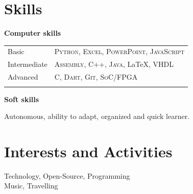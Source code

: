 \documentclass[a4paper,10pt]{article}
\begin{document}
\section{Skills}

\textbf{Computer skills} \\
\begin{tabular}{p{2.3cm}l}
    Basic & \textsc{Python}, \textsc{Excel}, \textsc{PowerPoint}, \textsc{JavaScript} \\
    Intermediate & \textsc{Assembly}, \textsc{C++}, \textsc{Java}, \LaTeX, \textsc{VHDL} \\
    Advanced & \textsc{C}, \textsc{Dart}, \textsc{Git}, \textsc{SoC/FPGA} \\
    \\
\end{tabular}

\parbox{2.8cm}{\textbf{Soft skills}} Autonomous, ability to adapt, organized and quick learner.


\section{Interests and Activities}

Technology, Open-Source, Programming \\
Music, Travelling
\end{document}
